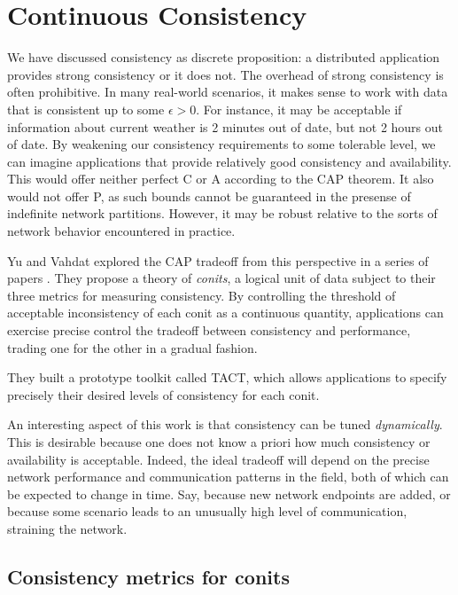 \section{Continuous Consistency}
\label{sec:contcons}

We have discussed consistency as discrete proposition: a distributed
application provides strong consistency or it does not. The overhead
of strong consistency is often prohibitive. In many real-world
scenarios, it makes sense to work with data that is consistent up to
some $\epsilon > 0$. For instance, it may be acceptable if information
about current weather is 2 minutes out of date, but not 2 hours out of
date. By weakening our consistency requirements to some tolerable
level, we can imagine applications that provide relatively good
consistency and availability. This would offer neither perfect C or A
according to the CAP theorem. It also would not offer P, as such
bounds cannot be guaranteed in the presense of indefinite network
partitions. However, it may be robust relative to the sorts of network
behavior encountered in practice.

Yu and Vahdat explored the CAP tradeoff from this perspective in a
series of papers \cite{2000tact} \cite{2000tactalgorithms}
\cite{10.5555/1251229.1251250} \cite{DBLP:conf/icdcs/YuV01}
\cite{2002tact}. They propose a theory of \emph{conits}, a logical
unit of data subject to their three metrics for measuring
consistency. By controlling the threshold of acceptable inconsistency
of each conit as a continuous quantity, applications can exercise
precise control the tradeoff between consistency and performance,
trading one for the other in a gradual fashion.

They built a prototype toolkit called TACT, which allows applications
to specify precisely their desired levels of consistency for each
conit.

An interesting aspect of this work is that consistency can be tuned
\emph{dynamically}. This is desirable because one does not know a
priori how much consistency or availability is acceptable. Indeed, the
ideal tradeoff will depend on the precise network performance and
communication patterns in the field, both of which can be expected to
change in time. Say, because new network endpoints are added, or
because some scenario leads to an unusually high level of
communication, straining the network.


\subsection{Consistency metrics for conits}

